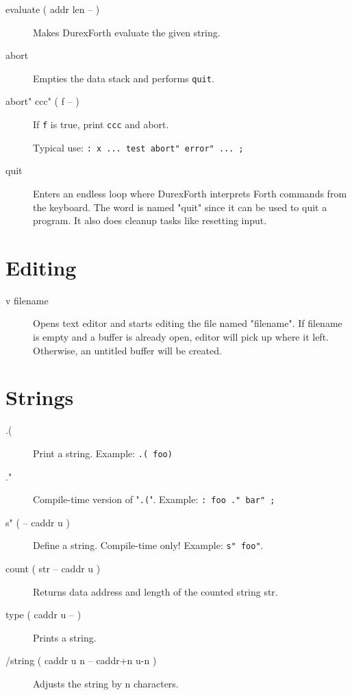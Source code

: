 \begin{description}
\item[evaluate ( addr len -- )] Makes DurexForth evaluate the given string.

\item[abort] Empties the data stack and performs \texttt{quit}.

\item[abort" ccc" ( f -- ) ] If \texttt{f} is true, print \texttt{ccc} and abort.

    Typical use: \texttt{: x ... test abort" error" ... ;}

\item[quit] Enters an endless loop where DurexForth interprets Forth commands from the keyboard. The word is named "quit" since it can be used to quit a program. It also does cleanup tasks like resetting input.

\end{description}

\section{Editing}

\begin{description}
\item[v filename]

Opens text editor and starts editing the file named "filename".
If filename is empty and a buffer is already open, editor will pick up where it left.
Otherwise, an untitled buffer will be created.

\end{description}

\section{Strings}

\begin{description}
\item[.(]

Print a string. Example: \texttt{.( foo)}

\item[."]

Compile-time version of "\texttt{.(}". Example: \texttt{: foo ." bar" ;}

\item[s" ( -- caddr u )] Define a string. Compile-time only! Example: \texttt{s" foo"}.

\item[count ( str -- caddr u )] Returns data address and length of the counted string str.

\item[type ( caddr u -- )] Prints a string.

\item[/string ( caddr u n -- caddr+n u-n )] Adjusts the string by n characters. 

\end{description}

